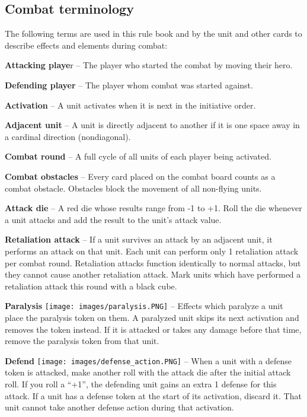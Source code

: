 \documentclass[12pt]{article}
\begin{document}
\subsection*{\hypertarget{Combatterminology}{Combat terminology}}
The following terms are used in this rule book and by the unit and other cards to describe effects
and elements during combat:\par
\textbf{Attacking playe}r – The player who started the combat by moving their hero.\par
\textbf{Defending player} – The player whom combat was started against.\par
\textbf{Activation} – A unit activates when it is next in the initiative order.\par
\textbf{Adjacent unit} – A unit is directly adjacent to another if it is one space away in a cardinal direction (nondiagonal).\par
\textbf{Combat round} – A full cycle of all units of each player being activated.\par
\textbf{Combat obstacles} – Every card placed on the combat board counts as a combat obstacle.
Obstacles block the movement of all non-flying units.\par
\textbf{Attack die} – A red die whose results range from -1 to +1. Roll the die whenever a unit attacks and
add the result to the unit’s attack value.\par
\textbf{\hypertarget{Retaliate}{Retaliation attack}} – If a unit survives an attack by an adjacent unit, it performs an attack on that unit. Each unit can perform only 1 retaliation attack per combat round. Retaliation attacks function
identically to normal attacks, but they cannot cause another retaliation attack. Mark units which
have performed a retaliation attack this round with a black cube.\par
\textbf{Paralysis} \texttt{[image: images/paralysis.PNG]} – Effects which paralyze a unit place the paralysis token on them. A paralyzed unit
skips its next activation and removes the token instead. If it is attacked or takes any damage before
that time, remove the paralysis token from that unit.\par
\textbf{\hypertarget{Defend}{Defend}} \texttt{[image: images/defense\_action.PNG]} – When a unit with a defense token is attacked, make another roll with the attack die
after the initial attack roll. If you roll a “+1”, the defending unit gains an extra 1 defense for this
attack. If a unit has a defense token at the start of its activation, discard it. That unit cannot take another defense action during that activation.
\end{document}
